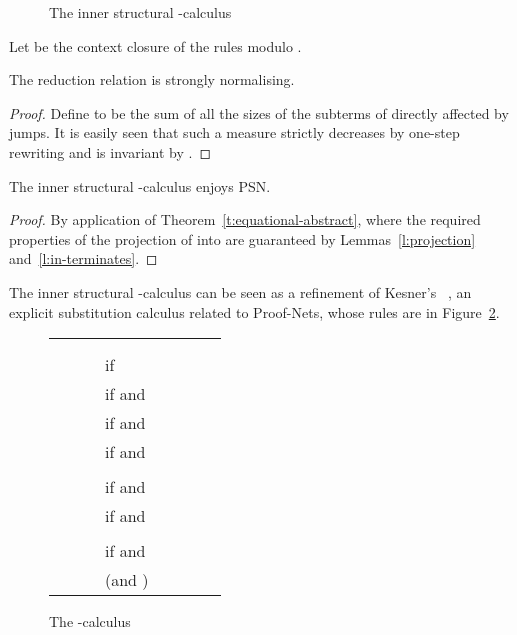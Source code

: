 \documentclass{LMCS}
\renewcommand{\>}{\rightarrow}
\begin{document}
\begin{figure}

\caption{\label{fig:inn-oriented-f} The inner structural -calculus }
\end{figure}


Let  be the context closure of the rules  modulo .

\begin{lem}
\label{l:in-terminates}
The reduction relation  is strongly normalising.
\end{lem}

\begin{proof}
Define  to be the sum of all the sizes of the subterms of  directly
affected by jumps. It is easily seen that 
such a measure strictly decreases 
by one-step rewriting and is invariant by 
.
\end{proof}

\begin{cor}
The inner structural -calculus   enjoys PSN.
\end{cor}

\begin{proof}
By application of Theorem~\ref{t:equational-abstract},
where the required properties 
of the projection of  into 
are guaranteed by Lemmas~\ref{l:projection}
and~\ref{l:in-terminates}.
\end{proof}

\noindent The inner structural -calculus can be seen as a refinement of
Kesner's ~\cite{Kes07}, an explicit
substitution calculus related to Proof-Nets, whose rules are in
Figure~\ref{fig:les-rules}.

\begin{figure}
\begin{center}
 \begin{tabular}{llllllll}
&&  \\
&& \\
&&   & if  \\
&& & if  and \\
&& & if  and \\
&&& if  and \\
&&\\
    & &   & if  and \\
    & &   & if  and \\\\
 & &  & if  and  \\ &&&(and )
\end{tabular}
\end{center}
\caption{The -calculus\label{fig:les-rules}}
\end{figure}
\end{document}
